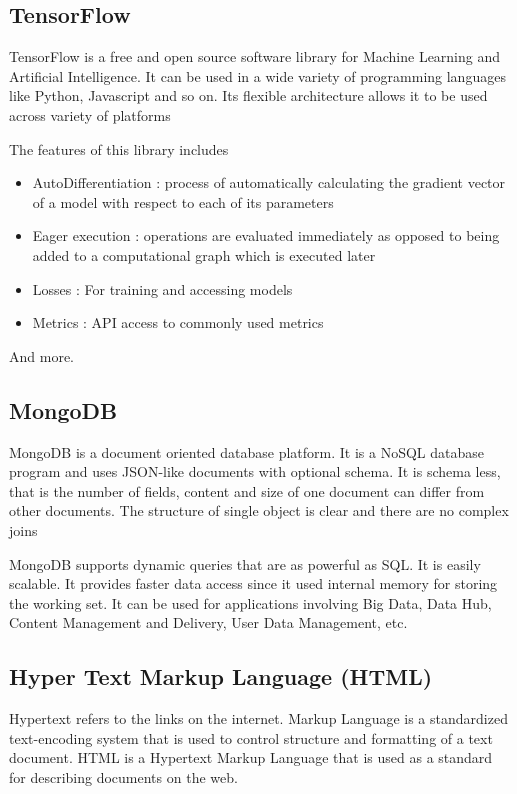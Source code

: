 \subsection{TensorFlow}
TensorFlow is a free and open source software library for Machine Learning and Artificial Intelligence. It can be used in a wide variety of programming languages like Python, Javascript and so on. Its flexible architecture allows it to be used across variety of platforms \newline

The features of this library includes
\begin{itemize}
	\item AutoDifferentiation : process of automatically calculating the gradient vector of a model with respect to each of its parameters
	\item Eager execution : operations are evaluated immediately as opposed to being added to a computational graph which is executed later
	\item Losses : For training and accessing models
	\item Metrics : API access to commonly used metrics
\end{itemize}
And more.

\subsection{MongoDB}
MongoDB is a document oriented database platform. It is a NoSQL database program and uses JSON-like documents with optional schema. It is schema less, that is the number of fields, content and size of one document can differ from other documents. The structure of single object is clear and there are no complex joins\newline

MongoDB supports dynamic queries that are as powerful as SQL. It is easily scalable. It provides faster data access since it used internal memory for storing the working set. It can be used for applications involving Big Data, Data Hub, Content Management and Delivery, User Data Management, etc.

\subsection{Hyper Text Markup Language (HTML)}
Hypertext refers to the links on the internet. Markup Language is a standardized text-encoding system that is used to control structure and formatting of a text document. HTML is a Hypertext Markup Language that is used as a standard for describing documents on the web. \newline

